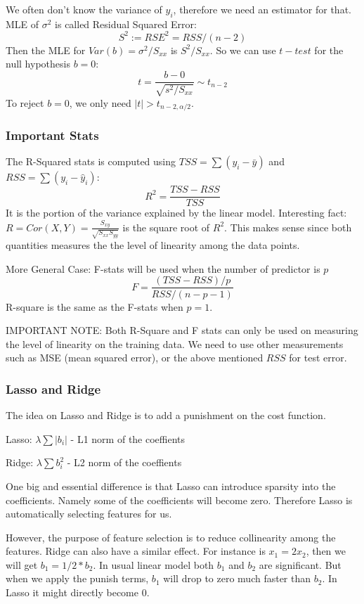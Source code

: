 \documentclass[12pt]{amsart}
\numberwithin{equation}{section}
\theoremstyle{plain}
\theoremstyle{definition}
\begin{document}
We often don't know the variance of $y_i$, therefore we need an estimator for that. MLE of $\sigma^2$ is called Residual Squared Error:
$$
S^2:= RSE^2 = RSS/(n-2)
$$
Then the MLE for $Var(b)=\sigma^2/S_{xx}$ is $S^2/S_{xx}$. So we can use $t-test$ for the null hypothesis $b = 0$:
$$
t = \frac{b-0}{\sqrt{s^2/S_{xx}}} \sim t_{n-2}
$$
To reject $b=0$, we only need $|t|>t_{n-2,\alpha/2}$.

\subsubsection{Important Stats}
The R-Squared stats is computed using $TSS=\sum(y_i-\bar y)$ and $RSS=\sum(y_i - \hat y_i)$:
$$
R^2=\frac{TSS-RSS}{TSS}
$$
It is the portion of the variance explained by the linear model. Interesting fact: 
$R = Cor(X,Y)=\frac{S_{xy}}{\sqrt{S_{xx}S_{yy}}}$ is the square root of $R^2$. This makes sense since both quantities measures the the level of linearity among the data points.

More General Case: F-stats will be used when the number of predictor is $p$
$$
F = \frac{(TSS-RSS)/p}{RSS/(n-p-1)}
$$
R-square is the same as the F-stats when $p=1$.

IMPORTANT NOTE: Both R-Square and F stats can only be used on measuring the level of linearity on the training data. We need to use other measurements such as MSE (mean squared error), or the above mentioned $RSS$ for test error.

\subsubsection{Lasso and Ridge}
The idea on Lasso and Ridge is to add a punishment on the cost function. 

Lasso: $\lambda\sum |b_i|$ - L1 norm of the coeffients

Ridge: $\lambda\sum b_i^2$ - L2 norm of the coeffients

One big and essential difference is that Lasso can introduce sparsity into the coefficients. Namely some of the coefficients will become zero. Therefore Lasso is automatically selecting features for us. 

However, the purpose of feature selection is to reduce collinearity among the features. Ridge can also have a similar effect. For instance is $x_1 = 2x_2$, then we will get $b_1 = 1/2*b_2$. In usual linear model both $b_1$ and $b_2$ are significant. But when we apply the punish terms, $b_1$ will drop to zero much faster than $b_2$. In Lasso it might directly become 0.
\end{document}
